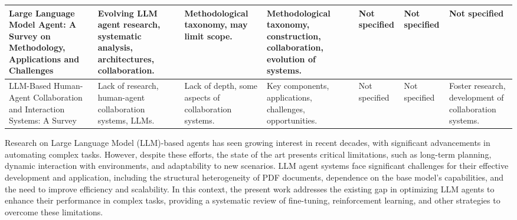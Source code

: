 \begin{table}[h]
\begin{tabular}{|p{3.5cm}|p{3.5cm}|p{3.5cm}|p{3.5cm}|p{3.5cm}|p{3.5cm}|p{3.5cm}|}
        \hline
        Large Language Model Agent: A Survey on Methodology, Applications and Challenges \cite{ref-4} & Evolving LLM agent research, systematic analysis, architectures, collaboration. & Methodological taxonomy, may limit scope. & Methodological taxonomy, construction, collaboration, evolution of systems. & Not specified & Not specified & Not specified \\
        \hline
        LLM-Based Human-Agent Collaboration and Interaction Systems: A Survey \cite{ref-5} & Lack of research, human-agent collaboration systems, LLMs. & Lack of depth, some aspects of collaboration systems. & Key components, applications, challenges, opportunities. & Not specified & Not specified & Foster research, development of collaboration systems. \\
        \hline
    \end{tabular}
\end{table}

\par\par
Research on Large Language Model (LLM)-based agents has seen growing interest in recent decades, with significant advancements in automating complex tasks. However, despite these efforts, the state of the art presents critical limitations, such as long-term planning, dynamic interaction with environments, and adaptability to new scenarios. LLM agent systems face significant challenges for their effective development and application, including the structural heterogeneity of PDF documents, dependence on the base model's capabilities, and the need to improve efficiency and scalability. In this context, the present work addresses the existing gap in optimizing LLM agents to enhance their performance in complex tasks, providing a systematic review of fine-tuning, reinforcement learning, and other strategies to overcome these limitations.

